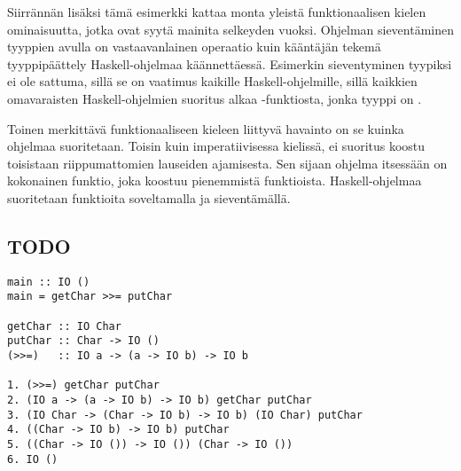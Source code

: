 \documentclass[finnish]{tktltiki2}
\begin{document}
Siirrännän lisäksi tämä esimerkki kattaa monta yleistä funktionaalisen kielen ominaisuutta, jotka
ovat syytä mainita selkeyden vuoksi. Ohjelman sieventäminen tyyppien avulla on vastaavanlainen
operaatio kuin kääntäjän tekemä tyyppipäättely Haskell-ohjelmaa käännettäessä. Esimerkin
sieventyminen tyypiksi  ei ole sattuma, sillä se on vaatimus kaikille
Haskell-ohjelmille, sillä kaikkien omavaraisten Haskell-ohjelmien suoritus alkaa
-funktiosta, jonka tyyppi on .

Toinen merkittävä funktionaaliseen kieleen liittyvä havainto on se kuinka ohjelmaa suoritetaan.
Toisin kuin imperatiivisessa kielissä, ei suoritus koostu toisistaan riippumattomien lauseiden
ajamisesta. Sen sijaan ohjelma itsessään on kokonainen funktio, joka koostuu pienemmistä
funktioista. Haskell-ohjelmaa suoritetaan funktioita soveltamalla ja sieventämällä.





\subsection{TODO}




\begin{lstlisting}[float,label={lst:ioprog},caption={IO-ohjelma ja sen evaluaatio}]
main :: IO ()
main = getChar >>= putChar

getChar :: IO Char
putChar :: Char -> IO ()
(>>=)   :: IO a -> (a -> IO b) -> IO b

1. (>>=) getChar putChar
2. (IO a -> (a -> IO b) -> IO b) getChar putChar
3. (IO Char -> (Char -> IO b) -> IO b) (IO Char) putChar
4. ((Char -> IO b) -> IO b) putChar
5. ((Char -> IO ()) -> IO ()) (Char -> IO ())
6. IO ()
\end{lstlisting}
\end{document}
